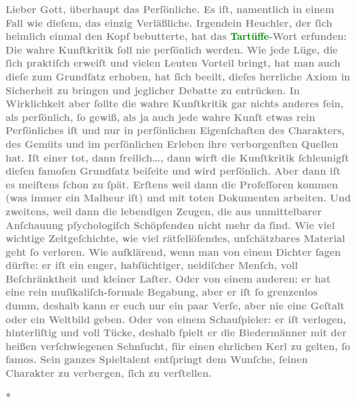 \pstart
           \noindent{}\textcolor{gray}{\textbf{Lieber Gott, überhaupt das Perſönliche. Es iſt, namentlich in
                  einem Fall wie dieſem, das einzig Verläßliche. Irgendein Heuchler, der ſich
                  heimlich einmal den Kopf bebutterte, hat das \textcolor{green}{Tartüffe}{}\ledrightnote{{$\rightarrow$}\textcolor{green}{Tartuffe}}-Wort erfunden: Die wahre Kunſtkritik ſoll nie
                  perſönlich werden. Wie jede Lüge, die ſich praktiſch erweiſt und vielen Leuten
                  Vorteil bringt, hat man auch dieſe zum Grundſatz erhoben, hat ſich beeilt, dieſes
                  herrliche Axiom in Sicherheit zu bringen und jeglicher Debatte zu entrücken. In
                  Wirklichkeit aber ſollte die wahre Kunſtkritik gar nichts anderes ſein, als
                  perſönlich, ſo gewiß, als ja auch jede wahre Kunſt etwas rein Perſönliches iſt und
                  nur in perſönlichen Eigenſchaften des Charakters, des Gemüts und im perſönlichen
                  Erleben ihre verborgenſten Quellen hat. Iſt einer tot, dann freilich{\dots}, dann wirft die Kunſtkritik ſchleunigſt dieſen
                  famoſen Grundſatz beiſeite und wird perſönlich. Aber dann iſt es meiſtens ſchon zu
                  ſpät. Erſtens weil dann die Profeſſoren kommen (was immer ein Malheur iſt) und mit
                  toten Dokumenten arbeiten. Und zweitens, weil dann die lebendigen Zeugen, die aus
                  unmittelbarer Anſchauung pſychologiſch Schöpfenden nicht mehr da ſind. Wie viel
                  wichtige Zeitgeſchichte, wie viel rätſellöſendes, unſchätzbares Material geht ſo
                  verloren. Wie aufklärend, wenn man von einem Dichter ſagen dürfte: er iſt ein
                  enger, habſüchtiger, neidiſcher Menſch, voll Beſchränktheit und kleiner Laſter.
                  Oder von einem anderen: er hat eine rein muſikaliſch-formale Begabung, aber er iſt
                  ſo grenzenlos dumm, deshalb kann er euch nur ein paar Verſe, aber nie eine Geſtalt
                  oder ein Weltbild geben. Oder von einem Schauſpieler: er iſt verlogen,
                  hinterliſtig und voll Tücke, deshalb ſpielt er die Biedermänner mit der heißen
                  verſchwiegenen Sehnſucht, für einen ehrlichen Kerl zu gelten, ſo famos. Sein
                  ganzes Spieltalent entſpringt dem Wunſche, ſeinen Charakter zu verbergen, ſich zu
                  verſtellen.}}\pend
           
\pstart
           \centering{}\textcolor{gray}{\textbf{*}}\pend
           
